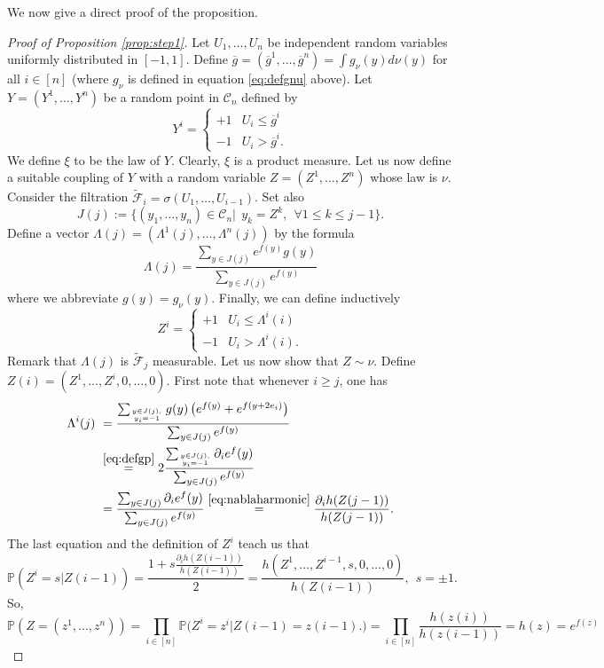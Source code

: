 \documentclass[12pt]{article}
\def \PP {\mathbb P}
\def \FFF {\mathcal{\tilde F}}
\def \DC {\mathcal{C}_n}
\theoremstyle{definition}
\theoremstyle{remark}
\begin{document}
We now give a direct proof of the proposition.
\begin{proof}[Proof of Proposition \ref{prop:step1}]
Let $U_1,\dots,U_n$ be independent random variables uniformly distributed in $[-1,1]$. Define $\overline g = (\overline g^1, \dots, \overline g^n) = \int g_{\nu}(y) d \nu(y)$ for all $i \in [n]$ (where $g_\nu$ is defined in equation \eqref{eq:defgnu} above). Let $Y=(Y^1,\dots,Y^n)$ be a random point in $\DC$ defined by
$$
Y^i = \begin{cases}
+1 & U_i \leq \overline g^i \\
-1 & U_i > \overline g^i.
\end{cases}
$$
We define $\xi$ to be the law of $Y$. Clearly, $\xi$ is a product measure. Let us now define a suitable coupling of $Y$ with a random variable $Z=(Z^1,\dots,Z^n)$ whose law is $\nu$. Consider the filtration $\FFF_i = \sigma(U_1, \dots, U_{i-1})$. Set also 
$$
J(j) := \{(y_1,\dots,y_n) \in \DC| ~~  y_k = Z^k, ~~ \forall 1 \leq k \leq j-1 \}.
$$
Define a vector $\Lambda(j) = (\Lambda^1(j),\dots,\Lambda^n(j))$ by the formula
$$
\Lambda(j) = \frac{\sum_{y \in J(j)} e^{f(y)} g(y)}{\sum_{y \in J(j)} e^{f(y)}}
$$
where we abbreviate $g(y) = g_\nu(y)$. Finally, we can define inductively
$$
Z^{i} = \begin{cases}
+1 & U_i \leq \Lambda^i(i) \\
-1 & U_i > \Lambda^i(i).
\end{cases}
$$
Remark that $\Lambda(j)$ is $\FFF_j$ measurable. Let us now show that $Z \sim \nu$. Define $Z(i)=(Z^1,\dots,Z^{i},0,\dots,0)$. First note that whenever $i \geq j$, one has
\begin{align*}
\Lambda^i(j) ~& = \frac{\sum_{y \in J(j), \atop y_i=-1} g(y) \left (e^{f(y)} + e^{f(y+2e_i)} \right ) }{\sum_{y \in J(j)} e^{f(y)}} \\
& \stackrel {\eqref{eq:defgp} }{=} 2 \frac{\sum_{y \in J(j), \atop y_i=-1} \partial_i e^{f}(y) }{\sum_{y \in J(j)} e^{f(y)}} \\
& = \frac{\sum_{y \in J(j)} \partial_i e^{f}(y) }{\sum_{y \in J(j)} e^{f(y)}} 
 \stackrel {\eqref{eq:nablaharmonic} }{=} \frac{\partial_i h(Z(j-1))}{h(Z(j-1))}.
\end{align*}
The last equation and the definition of $Z^{i}$ teach us that 
$$
\PP(Z^i = s | Z(i-1)) = \frac{1 + s \frac{\partial_i h(Z(i-1))}{h(Z(i-1))}}{2} = \frac{h(Z^1,\dots,Z^{i-1},s,0,\dots,0)}{h(Z(i-1))}, ~~ s = \pm 1.
$$
So,
$$
\PP(Z=(z^1,...,z^n)) = \prod_{i \in [n]} \PP \bigl (Z^i = z^i \bigl | Z(i-1) = z(i-1) \bigr . \bigr) = \prod_{i \in [n]} \frac{h(z(i))}{h(z(i-1))} = h(z) = e^{f(z)}
$$
\end{proof}
\end{document}
